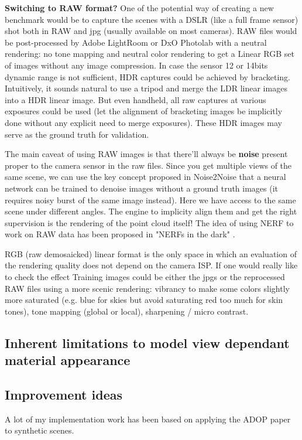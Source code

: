 \noindent \textbf{Switching to RAW format?} 
One of the potential way of creating a new benchmark would be to capture the scenes with a DSLR (like a full frame sensor) shot both in RAW and jpg (usually available on most cameras). RAW files would be post-processed by Adobe LightRoom or DxO Photolab with a neutral rendering: no tone mapping and neutral color rendering to get a Linear RGB set of images without any image compression. In case the sensor 12 or 14bits dynamic range is not sufficient, HDR captures could be achieved by bracketing. Intuitively, it sounds natural to use a tripod and merge the LDR linear images into a HDR linear image. But even handheld, all raw captures at various exposures could be used (let the alignment of bracketing images be implicitly done without any explicit need to merge exposures). These HDR images may serve as the ground truth for validation.

The main caveat of using RAW images is that there'll always be \textbf{noise} present proper to the camera sensor in the raw files. Since you get multiple views of the same scene, we can use the key concept proposed in Noise2Noise \cite{lehtinen2018noise2noise} that a neural network can be trained to denoise images without a ground truth images (it requires noisy burst of the same image instead). Here we have access to the same scene under different angles. The engine to implicity align them and get the right supervision is the rendering of the point cloud itself! The idea of using NERF to work on RAW data has been proposed in "NERFs in the dark" \cite{mildenhall2022rawnerf}.


RGB (raw demosaicked) linear format is the only space in which an evaluation of the rendering quality does not depend on the camera ISP.
If one would really like to check the effect Training images could be either the jpgs or the reprocessed RAW files using a more scenic rendering: vibrancy to make some colors slightly more saturated (e.g. blue for skies but avoid saturating red too much for skin tones), tone mapping (global or local), sharpening / micro contrast.

\subsection{Inherent limitations to model view dependant material appearance}
\label{subsec:view_dependant_materials}

\subsection{Improvement ideas}
\label{subsec:improvement_ideas}
A lot of my implementation work has been based on applying the ADOP paper to synthetic scenes.

